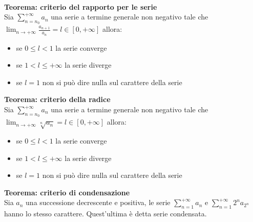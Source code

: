 \documentclass{article}
\begin{document}
\\
\textbf{Teorema: criterio del rapporto per le serie}\\
Sia $\sum_{n=n_0}^{+\infty}a_n$ una serie a termine generale non negativo tale che $\lim_{n\rightarrow+\infty}\frac{a_{n+1}}{a_n}=l\in[0,+\infty]$ allora:\begin{itemize}
    \item se $0\leq l<1$ la serie converge
    \item se $1<l\leq+\infty$ la serie diverge
    \item se $l=1$ non si può dire nulla sul carattere della serie
\end{itemize}
\textbf{Teorema: criterio della radice}\\
Sia $\sum_{n=n_0}^{+\infty}a_n$ una serie a termine generale non negativo tale che $\lim_{n\rightarrow+\infty}\sqrt[n]{a_n}=l\in[0,+\infty]$ allora:\begin{itemize}
    \item se $0\leq l<1$ la serie converge
    \item se $1<l\leq+\infty$ la serie diverge
    \item se $l=1$ non si può dire nulla sul carattere della serie
\end{itemize}
\textbf{Teorema: criterio di condensazione}\\
Sia $a_n$ una successione decrescente e positiva, le serie $\sum_{n=1}^{+\infty}a_n$ e $\sum_{n=1}^{+\infty}2^na_{2^n}$ hanno lo stesso carattere. Quest'ultima è detta serie condensata.
\end{document}
